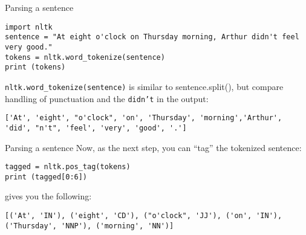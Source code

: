 \documentclass{beamer}
\begin{document}
\begin{frame}[fragile]{Parsing a sentence}
\begin{lstlisting}
import nltk
sentence = "At eight o'clock on Thursday morning, Arthur didn't feel very good."
tokens = nltk.word_tokenize(sentence)
print (tokens)
\end{lstlisting}

\texttt{nltk.word\_tokenize(sentence)} is similar to sentence.split(), but compare handling of punctuation and the \texttt{didn't} in the output:
\begin{lstlisting}
['At', 'eight', "o'clock", 'on', 'Thursday', 'morning','Arthur', 'did', "n't", 'feel', 'very', 'good', '.']
\end{lstlisting}
\end{frame}


\begin{frame}[fragile]{Parsing a sentence}
Now, as the next step, you can ``tag'' the tokenized sentence:
\begin{lstlisting}
tagged = nltk.pos_tag(tokens)
print (tagged[0:6])
\end{lstlisting}
gives you the following:
\begin{lstlisting}
[('At', 'IN'), ('eight', 'CD'), ("o'clock", 'JJ'), ('on', 'IN'),
('Thursday', 'NNP'), ('morning', 'NN')]
\end{lstlisting}


\end{frame}
\end{document}

